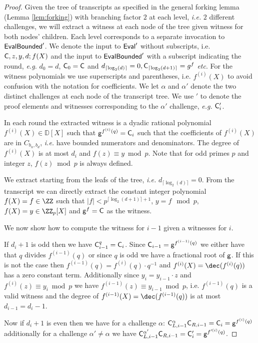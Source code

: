 \documentclass{article}
\theoremstyle{definition}
\begin{document}
\begin{proof}
Given the tree of transcripts as specified in the general forking lemma (Lemma \ref{lem:forking})  with branching factor $2$ at each level, \emph{i.e.} $2$ different challenges, we will extract a witness at each node of the tree given witness for both nodes' children. Each level corresponds to a separate invocation to $\textsf{{EvalBounded}}'$. We denote the input to $\textsf{{Eval}}'$ without subscripts, i.e. $\mathsf{C},z,y,d;f(X)$ and the input to $\textsf{{EvalBounded}}'$ with a subscript indicating the round, \emph{e.g.} $d_0=d$, $\mathsf{C}_0=\mathsf{C}$ and $d_{\lceil \log_2(d)\rceil }=0,\mathsf{C}_{\lceil \log_2(d+1)\rceil }=g^{f}$ \emph{etc}. For the witness polynomials we use superscripts and parentheses, i.e. $f^{(i)}(X)$ to avoid confusion with the notation for coefficients.  We let $\alpha$ and $\alpha'$ denote the two distinct challenges at each node of the transcript tree. We use $'$ to denote the proof elements and witnesses corresponding to the $\alpha'$ challenge, \emph{e.g.} $\mathsf{C}_i'$.

In each round the extracted witness is a dyadic rational polynomial $f^{(i)}(X)\in \mathbb{D}[X]$ such that $\mathsf{g}^{f^{(i)}(q)}=\mathsf{C}_i$ such that the coefficients of $f^{(i)}(X)$ are in $C_{b_n,b_d}$, \emph{i.e.} have bounded numerators and denominators. The degree of $f^{(i)}(X)$ is at most $d_i$ and $f(z) \equiv y \bmod p$. Note that for odd primes $p$ and integer $z$, $f(z)\bmod p$ is always defined.

We extract starting from the leafs of the tree, \emph{i.e.} $d_{\lceil \log_2(d)\rceil}=0$. From the transcript we can directly extract the constant integer polynomial $f(X)=f \in \ZZ$ such that $\vert f \vert < p^{\lceil\log_2(d+1)\rceil+1}$, $y=f \mod p$, $f(X)=y\in \ZZ_p[X]$ and $\mathsf{g}^{f}=\mathsf{C}$ as the witness.

We now show how to compute the witness for $i-1$ given a witnesses for $i$. 

If $d_i+1$ is odd then we have $\mathsf{C}_{i-1}^q=\mathsf{C}_i$. Since $\mathsf{C}_{i-1}=\mathsf{g}^{f^{(i-1)}(q)}$ we either have that $q$ divides $f^{(i-1)}(q)$ or since $q$ is odd we have a fractional root of $\mathsf{g}$. 
If this is not the case then $f^{(i-1)}(q)=f^{(i)}(q)\cdot q^{-1}$ and $f^{(i)}(X)=\dec(f^{(i)}(q))$ has a zero constant term. Additionally since $y_i=y_{i-1}\cdot z$ and $f^{(i)}(z)\equiv y_i \bmod p$ we have $f^{(i-1)}(z)\equiv y_{i-1} \bmod p$, i.e. $f^{(i-1)}(q)$ is a valid witness and the degree of $f^{(i-1)}(X)=\dec(f^{(i-1)}(q))$ is at most $d_{i-1}=d_i-1$. 

Now if $d_i+1$ is even then we have for a challenge $\alpha$: $\mathsf{C}_{L,i-1}^\alpha \mathsf{C}_{R,i-1}=\mathsf{C}_i=\mathsf{g}^{f^{(i)}(q)}$ additionally for a challenge $\alpha'\neq \alpha$ we have $\mathsf{C}_{L,i-1}^{\alpha'} \mathsf{C}_{R,i-1}=\mathsf{C}'_i=\mathsf{g}^{f'^{(i)}(q)}$.  


\end{proof}
\end{document}
